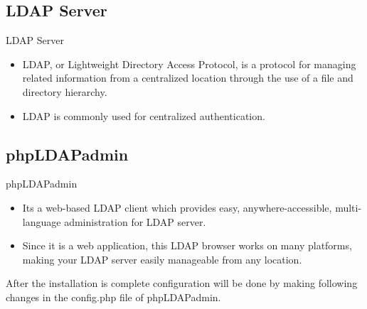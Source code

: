 \documentclass[10pt,xcolor=dvipsnames]{beamer}
\begin{document}
\subsection{LDAP Server}
\begin{frame}{LDAP Server}
	\begin{itemize}
	\item LDAP, or Lightweight Directory Access Protocol, is a protocol for managing related information from a centralized location through the use of a file and directory hierarchy.
	\item LDAP is commonly used for centralized authentication.
	\end{itemize}
\end{frame}
\subsection{phpLDAPadmin}
\begin{frame}{phpLDAPadmin}
	\begin{itemize}
	\item Its a web-based LDAP client which provides easy, anywhere-accessible, multi-language administration for LDAP server.\\
	\item Since it is a web application, this LDAP browser works on many platforms, making your LDAP server easily manageable from any location.
	\end{itemize}
	After the installation is complete configuration will be done by making following changes in the config.php file of phpLDAPadmin.

	
\end{frame}
\end{document}
